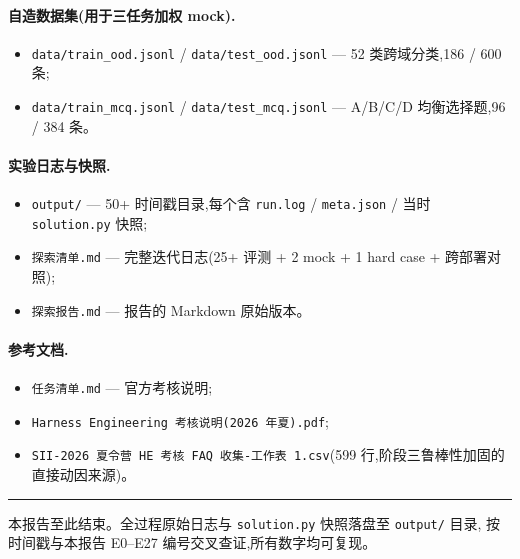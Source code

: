 \documentclass[11pt,a4paper]{ctexart}
\begin{document}
\paragraph{自造数据集(用于三任务加权 mock).}
\begin{itemize}[leftmargin=2em,itemsep=0.1em]
\item \texttt{data/train\_ood.jsonl} / \texttt{data/test\_ood.jsonl} --- 52 类跨域分类,186 / 600 条;
\item \texttt{data/train\_mcq.jsonl} / \texttt{data/test\_mcq.jsonl} --- A/B/C/D 均衡选择题,96 / 384 条。
\end{itemize}

\paragraph{实验日志与快照.}
\begin{itemize}[leftmargin=2em,itemsep=0.1em]
\item \texttt{output/} --- 50+ 时间戳目录,每个含 \texttt{run.log} / \texttt{meta.json} / 当时 \texttt{solution.py} 快照;
\item \texttt{探索清单.md} --- 完整迭代日志(25+ 评测 + 2 mock + 1 hard case + 跨部署对照);
\item \texttt{探索报告.md} --- 报告的 Markdown 原始版本。
\end{itemize}

\paragraph{参考文档.}
\begin{itemize}[leftmargin=2em,itemsep=0.1em]
\item \texttt{任务清单.md} --- 官方考核说明;
\item \texttt{Harness Engineering 考核说明(2026 年夏).pdf};
\item \texttt{SII-2026 夏令营 HE 考核 FAQ 收集-工作表 1.csv}(599 行,阶段三鲁棒性加固的直接动因来源)。
\end{itemize}

\vspace{1em}
\hrule
\vspace{0.4em}
\noindent\small\color{gray}
本报告至此结束。全过程原始日志与 \texttt{solution.py} 快照落盘至 \texttt{output/} 目录,
按时间戳与本报告 E0--E27 编号交叉查证,所有数字均可复现。
\end{document}
